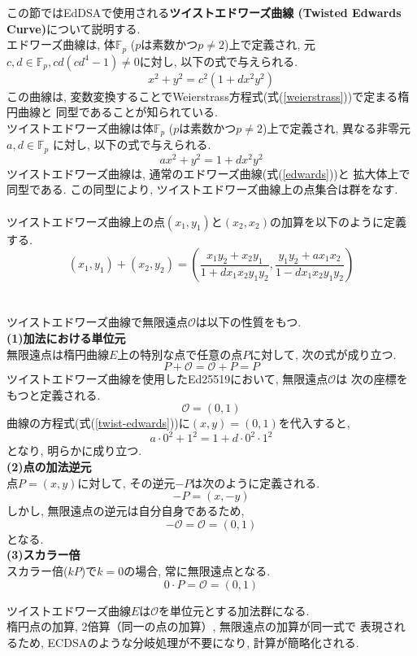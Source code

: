 この節ではEdDSAで使用される\textbf{ツイストエドワーズ曲線
(Twisted Edwards Curve)}について説明する.\\
\indent エドワーズ曲線は, 体$\mathbb{F}_p$ ($p$は素数かつ$p\neq 2$)上で定義され, 
元$c,d\in \mathbb{F}_p, cd(cd^{4}-1)\neq 0$に対し, 
以下の式で与えられる.
\begin{equation}\label{edwards}
  x^2 + y^2 = c^2(1+dx^2y^2)
\end{equation}
この曲線は, 変数変換することでWeierstrass方程式(式(\ref{weierstrass}))で定まる楕円曲線と
同型であることが知られている\cite{edwarscurve-to-ellipticcurve}.\\
\indent ツイストエドワーズ曲線は体$\mathbb{F}_p$ ($p$は素数かつ$p\neq 2$)上で定義され, 
異なる非零元$a,d\in \mathbb{F}_p$ に対し, 以下の式で与えられる.
\begin{equation}\label{twist-edwards}
  ax^2 + y^2 = 1 + dx^2y^2
\end{equation}
ツイストエドワーズ曲線は, 通常のエドワーズ曲線(式(\ref{edwards}))と
拡大体上で同型である. この同型により, %
ツイストエドワーズ曲線上の点集合は群をなす\cite{twisted}.\\[1em]
\\
\indent ツイストエドワーズ曲線上の点$(x_1,y_1)$と$(x_2,x_2)$の加算を以下のように定義する.
\[
  (x_1,y_1)+(x_2,y_2)=
  \left( 
    \frac{x_1y_2+x_2y_1}{1+dx_1x_2y_1y_2},
    \frac{y_1y_2+ax_1x_2}{1-dx_1x_2y_1y_2} 
  \right)
\] \\[1em]
\\
\indent ツイストエドワーズ曲線で無限遠点$\mathcal{O}$は以下の性質をもつ.\\[0.5em]
\noindent\textbf{(1)加法における単位元}\\
\indent 無限遠点は楕円曲線$E$上の特別な点で任意の点$P$に対して, 次の式が成り立つ.
\[
  P+\mathcal{O}=\mathcal{O}+P=P
\]
\indent ツイストエドワーズ曲線を使用したEd25519において, 無限遠点$\mathcal{O}$は
次の座標をもつと定義される.
\[
  \mathcal{O}=(0,1)
\]
\indent 曲線の方程式(式(\ref{twist-edwards}))に$(x,y)=(0,1)$を代入すると,
\[
  a\cdot 0^2 + 1^2 = 1 + d\cdot 0^{2}\cdot 1^2
\]
となり, 明らかに成り立つ.\\[1em]
\noindent \textbf{(2)点の加法逆元}\\
\indent 点$P=(x,y)$に対して, その逆元$-P$は次のように定義される.
\[
  -P=(x,-y)
\]
\indent しかし, 無限遠点の逆元は自分自身であるため, 
\[
  -\mathcal{O}=\mathcal{O}=(0,1)
\]
となる.\\
\noindent \textbf{(3)スカラー倍}\\
\indent スカラー倍($kP$)で$k=0$の場合, 常に無限遠点となる.
\[
  0\cdot P=\mathcal{O}=(0,1)
\]

\indent ツイストエドワーズ曲線$E$は$\mathcal{O}$を単位元とする加法群になる.\\
楕円点の加算, 2倍算（同一の点の加算）, 無限遠点の加算が同一式で
表現されるため, ECDSAのような分岐処理が不要になり, 計算が簡略化される.\\



